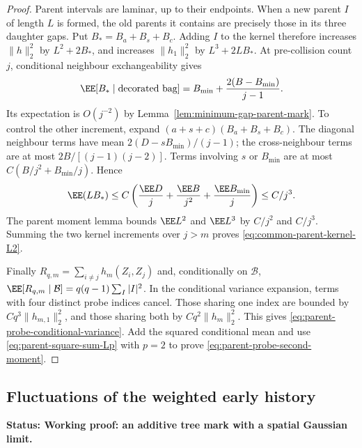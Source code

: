 \documentclass[11pt,letterpaper]{article}
\newcommand{\status}[1]{\textbf{Status: #1.}}
\begin{document}
\begin{proof}
Parent intervals are laminar, up to their endpoints. When a new
parent $I$ of length $L$ is formed, the old parents it contains
are precisely those in its three daughter gaps. Put
$B_*=B_a+B_s+B_c$. Adding $I$ to the kernel therefore increases
$\|h\|_2^2$ by $L^2+2B_*$, and increases $\|h_1\|_2^2$ by
$L^3+2LB_*$.
At pre-collision count $j$, conditional neighbour exchangeability
gives
\[
 \EE[B_*\mid\text{decorated bag}]
       =B_{\min}+\frac{2(B-B_{\min})}{j-1}.
\]
Its expectation is $O(j^{-2})$ by
Lemma~\ref{lem:minimum-gap-parent-mark}.
To control the other increment, expand
$(a+s+c)(B_a+B_s+B_c)$. The diagonal neighbour terms have mean
$2(D-sB_{\min})/(j-1)$; the cross-neighbour terms are at most
$2B/[(j-1)(j-2)]$. Terms involving $s$ or $B_{\min}$ are at
most $C(B/j^2+B_{\min}/j)$. Hence
\[
 \EE(LB_*)\le C\left(\frac{\EE D}{j}
              +\frac{\EE B}{j^2}+\frac{\EE B_{\min}}j\right)
                         \le C/j^3.
\]
The parent moment lemma bounds $\EE L^2$ and $\EE L^3$ by
$C/j^2$ and $C/j^3$. Summing the two kernel increments over
$j>m$ proves \eqref{eq:common-parent-kernel-L2}.

Finally
$R_{q,m}=\sum_{i\ne j}h_m(Z_i,Z_j)$ and, conditionally on
$\mathcal B$,
$\EE[R_{q,m}\mid\mathcal B]=q(q-1)\sum_I|I|^2$.
In the conditional variance expansion, terms with four distinct
probe indices cancel. Those sharing one index are bounded by
$Cq^3\|h_{m,1}\|_2^2$, and those sharing both by
$Cq^2\|h_m\|_2^2$. This gives
\eqref{eq:parent-probe-conditional-variance}.
Add the squared conditional mean and use
\eqref{eq:parent-square-sum-Lp} with $p=2$ to prove
\eqref{eq:parent-probe-second-moment}.
\end{proof}

\subsection{Fluctuations of the weighted early history}
\label{sec:parent-square-fluctuations}

\status{Working proof: an additive tree mark with a spatial Gaussian limit}
\end{document}
